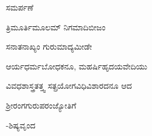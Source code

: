 
\begin{center}
{\Large ಸಮರ್ಪಣೆ}
\end{center}

\begin{center}
ತ್ರಿಮೂರ್ತಿಮೂಲಮ್ ನಿಗಮಾದಿಬೀಜಂ 

ಸನಾತನಾಖ್ಯಂ ಗುರುಮಾದ್ಯಮೀಡೇ
\end{center}

\begin{center}
ಆರ್ಯಧರ್ಮಬೋಧಕನೂ, ಮಹರ್ಷಿಹೃದಯವೇದಿಯು

ವಿವಧಶಾಸ್ತ್ರತತ್ತ್ವ  ಸತ್ಪ್ರಯೋಗವಿಧಿವಿಶಾರದನೂ ಆದ 

ಶ್ರೀರಂಗಗುರುಪರಂಜ್ಯೋತಿಗೆ 
\end{center}

\hfill {-ಶಿಷ್ಯವೃಂದ}

